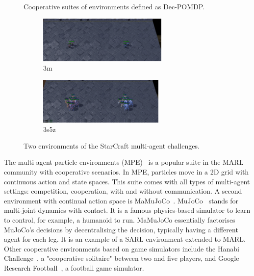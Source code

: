 \begin{figure}
    \centering
    
    \caption{Cooperative suites of environments defined as Dec-POMDP.}
    \label{fig:ch3_envs}
\end{figure}
\begin{figure}
     \centering
     \begin{subfigure}[b]{0.5\textwidth}
         \centering
         \includegraphics[height=2.3cm]{figures/ch3/3m_screen.pdf}
         \caption{3m}
         \label{fig:ch3_3m}
     \end{subfigure}%
     \begin{subfigure}[b]{0.5\textwidth}
         \centering
         \includegraphics[height=2.3cm]{figures/ch3/3s5z_screen.pdf}
         \caption{3s5z}
         \label{fig:ch3_3s5z}
     \end{subfigure}
    \caption{Two environments of the StarCraft multi-agent challenges.}
    \label{fig:ch3_smac}
\end{figure}



The multi-agent particle environments (MPE)~\citep{lowe2017multi} is a popular suite in the MARL community with cooperative scenarios.
In MPE, particles move in a 2D grid with continuous action and state spaces.
This suite comes with all types of multi-agent settings: competition, cooperation, with and without communication.
A second environment with continual action space is MaMuJoCo~\citep{peng2021facmac}.
MuJoCo~\citep{todorov2012mujoco} stands for multi-joint dynamics with contact.
It is a famous physics-based simulator to learn to control, for example, a humanoid to run.
MaMuJoCo essentially factorises MuJoCo's decisions by decentralising the decision, typically having a different agent for each leg.
It is an example of a SARL environment extended to MARL.
Other cooperative environments based on game simulators include the Hanabi Challenge~\citep{Bard_2020}, a "cooperative solitaire" between two and five players, and Google Research Football~\citep{kurach2020google}, a football game simulator.

